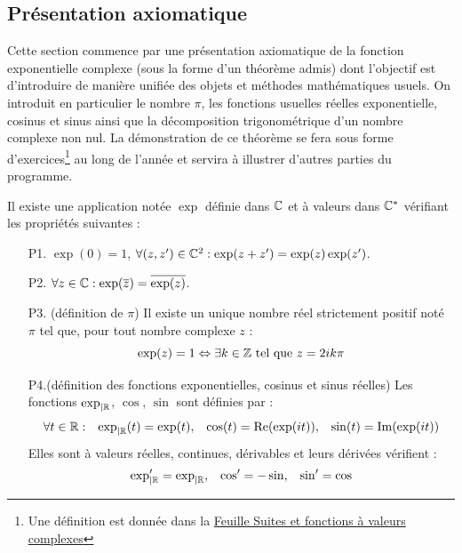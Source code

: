 \subsection{Présentation axiomatique}
Cette section commence par une présentation axiomatique de la fonction exponentielle complexe (sous la forme d'un théorème admis) dont l'objectif est d'introduire de manière unifiée des objets et méthodes mathématiques usuels. On introduit en particulier le nombre $\pi$, les fonctions usuelles réelles exponentielle, cosinus et sinus ainsi que la décomposition trigonométrique d'un nombre complexe non nul. La démonstration de ce théorème se fera sous forme d'exercices\footnote{Une définition est donnée dans la \href{http://back.maquisdoc.net/data/temptex/fexvc.pdf}{Feuille Suites et fonctions à valeurs complexes}} au long de l'année et servira à illustrer d'autres parties du programme.
\begin{thm}
 Il existe une application notée $\exp$ définie dans $\mathbb{C}$ et à valeurs dans $\mathbb{C}^*$ vérifiant les propriétés suivantes :
\begin{itemize}
 \item[P1.] $\exp (0) = 1$,  \hspace{0.5cm} $\forall (z,z^\prime)\in \mathbb{C}^2 : \exp(z + z^\prime)= \exp(z) \exp(z^\prime)$.
 
 \item[P2.] $\forall z \in \mathbb{C} : \exp(\overline{z}) = \overline{\exp(z)}$.

 \item[P3. (définition de $\pi$)] Il existe un unique nombre réel strictement positif noté $\pi$ tel que, pour tout nombre complexe $z$ :
\begin{displaymath}
 \exp (z) = 1 \Leftrightarrow \exists k \in \mathbb{Z} \text{ tel que } z= 2ik\pi
\end{displaymath}

\item[P4.(définition des fonctions exponentielles, cosinus et sinus réelles)] Les fonctions $\exp_{|\mathbb{R}}$, $\cos$, $\sin$ sont définies par :
\begin{align*}
 \forall t \in \mathbb{R} &:& \exp_{|\mathbb{R}}(t) = \exp(t) &,& \cos (t)  = \mathop{\mathrm{Re}}(\exp(it)) &,& \sin (t) = \mathop{\mathrm{Im}} (\exp(it))
\end{align*}
Elles sont à valeurs réelles, continues, dérivables et leurs dérivées vérifient :
\begin{align*}
 \exp_{|\mathbb{R}} ^\prime = \exp_{|\mathbb{R}} &,& \cos ^\prime = -\sin  &,& \sin^\prime = \cos
\end{align*}
\end{itemize}
\end{thm}


